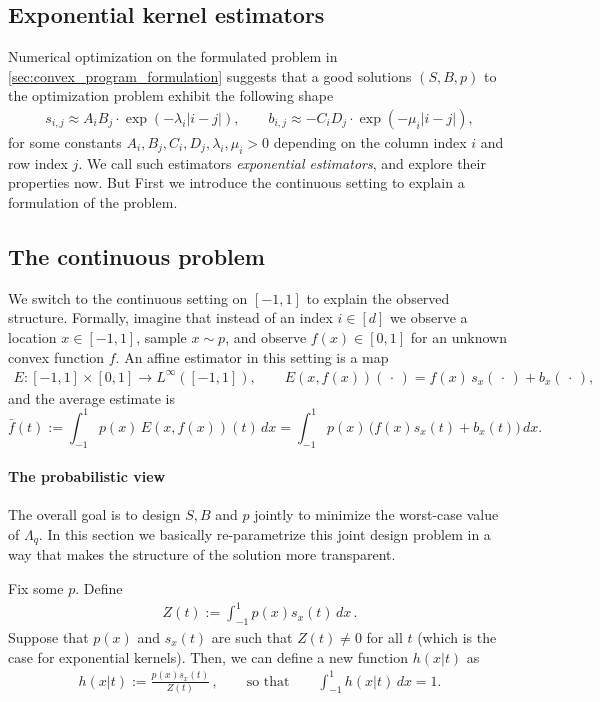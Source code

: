 \documentclass{article}
\theoremstyle{plain}
\theoremstyle{definition}
\theoremstyle{plain}
\begin{document}
\subsection{Exponential kernel estimators}
Numerical optimization on the formulated problem in \cref{sec:convex_program_formulation}
suggests that a good solutions $(S,B,p)$ to the optimization problem exhibit the following shape
\begin{align}
    s_{i,j} \approx A_i B_j \cdot \exp(-\lambda_i |i-j|),
    \qquad
    b_{i,j} \approx - C_i D_j \cdot \exp(-\mu_i |i-j|),
\end{align}
for some constants $A_i, B_j, C_i, D_j, \lambda_i,\mu_i>0$ depending on the column index $i$ and row index $j$.
We call such estimators \emph{exponential estimators}, and explore their properties now.
But First we introduce the continuous setting to explain a formulation of the problem.

\subsection{The continuous problem}
We switch to the continuous setting on $[-1,1]$ to explain the observed structure.
Formally, imagine that instead of an index $i\in[d]$ we observe a location $x\in[-1,1]$, sample $x\sim p$, and observe $f(x)\in[0,1]$ for an unknown convex function $f$.
An affine estimator in this setting is a map
\begin{align}
    E: [-1,1]\times[0,1]\to L^\infty([-1,1]),\qquad
    E(x,f(x))(\,\cdot\,)= f(x)\,s_x(\,\cdot\,) + b_x(\,\cdot\,),
\end{align}
and the average estimate is
\begin{equation}
    \bar f(t) := \int_{-1}^1 p(x)\,E(x,f(x))(t)\,dx
    = \int_{-1}^1 p(x)\,\bigl(f(x)s_x(t)+b_x(t)\bigr)\,dx.
    \label{eq:barf_def}
\end{equation}

\paragraph{The probabilistic view}
The overall goal is to design $S, B$ and $p$ jointly to minimize the worst-case value of $\Lambda_q$.
In this section we basically re-parametrize this joint design problem in a way that makes the structure of the solution more transparent.

Fix some $p$.
Define
\begin{align}
    Z(t) := \int_{-1}^{1} p(x) s_x(t) \,dx\,.
\end{align}
Suppose that $p(x)$ and $s_x(t)$ are such that $Z(t) \neq 0$ for all $t$ (which is the case for exponential kernels).
Then, we can define a new function $h(x|t)$ as
\begin{align}
    h(x|t) := \frac{p(x) s_x(t)}{Z(t)}\,, \qquad \text{so that} \qquad \int_{-1}^{1} h(x|t) \, dx = 1.
\end{align}
\end{document}

